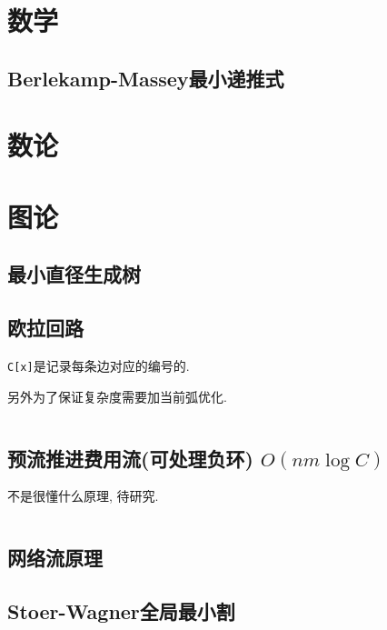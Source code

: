 \documentclass[a4paper]{article}
\begin{document}
	\begin{multicols}{2}
		\section{数学}
			\subsection{Berlekamp-Massey最小递推式}
				
		
		\section{数论}
				
		\section{图论}
			\subsection{最小直径生成树}
					
			
			\subsection{欧拉回路}
				\texttt{C[x]}是记录每条边对应的编号的.
				
				另外为了保证复杂度需要加当前弧优化.
				
				\inputminted{cpp}{../src/graph/欧拉回路.cpp}
			
			\subsection{预流推进费用流(可处理负环) $O(nm \log C)$}
				不是很懂什么原理, 待研究.

				\inputminted{cpp}{../src/graph/预流推进费用流.cpp}

			\subsection{网络流原理}
				
			
			\subsection{Stoer-Wagner全局最小割}
				\inputminted{cpp}{../src/graph/stoer-wagner.cpp}
			

\end{multicols}
\end{document}
